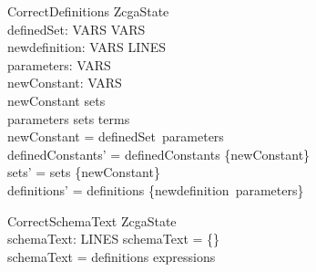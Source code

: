 \documentclass{article}
\begin{document}
\begin{schema}{CorrectDefinitions}
\Delta ZcgaState \\
definedSet: \power VARS \pfun VARS \\
newdefinition: \power VARS \pfun LINES \\
parameters: \power VARS \\
newConstant: VARS \\
\where
newConstant \notin sets \\
parameters \subseteq sets \cup terms \\
newConstant = definedSet~parameters \\
definedConstants' = definedConstants \cup \{newConstant\} \\
sets' = sets \cup \{newConstant\} \\
definitions' = definitions \cup \{newdefinition~parameters\}
\end{schema}

\begin{schema}{CorrectSchemaText}
\Xi ZcgaState \\
schemaText: \power LINES
\where
schemaText = \{\} \lor \\
schemaText = definitions \cup expressions
\end{schema}
\end{document}
